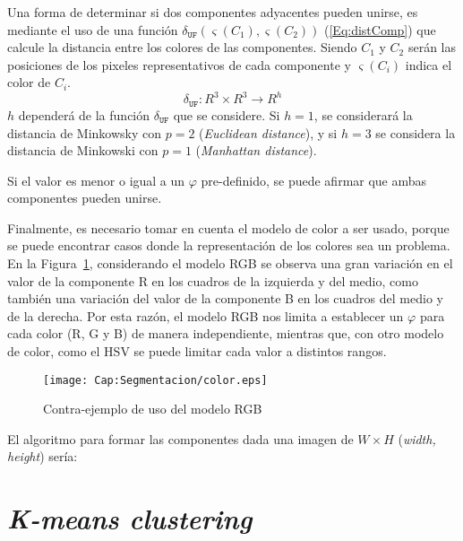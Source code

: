 Una forma de determinar si dos componentes adyacentes pueden unirse, es mediante
 el uso de una función $\delta_{\mathtt{UF}} (\varsigma (C_1), \varsigma (C_2))$
  (\ref{Eq:distComp}) que calcule la distancia entre los colores de las 
  componentes. Siendo $C_1$ y $C_2$ serán las posiciones de los pixeles 
  representativos de cada componente y $\varsigma(C_i)$ indica el color de $C_i$. 
\begin{equation}
	\delta_{\mathtt{UF}}:R^3\times R^3 \rightarrow R^h
	\label{Eq:distComp}
\end{equation}
$h$ dependerá de la función $\delta_{\mathtt{UF}}$ que se considere. Si $h=1$, 
se considerará la distancia de Minkowsky con $p=2$ (\textit{Euclidean 
distance}), y si $h=3$ se considera la distancia de Minkowski con $p=1$ 
(\textit{Manhattan distance}).\cite{Cordeiro:2012:Minkowski}

Si el valor es menor o igual a un $\varphi$ pre-definido, se puede afirmar que
 ambas componentes pueden unirse.

Finalmente, es necesario tomar en cuenta el modelo de color a ser usado, porque 
se puede encontrar casos donde la representación de los colores sea un problema.
 En la Figura~\ref{fig:cap-segmentacion:contraejemplo-rgb}, considerando el 
 modelo RGB se observa una gran variación en el valor de la componente R en los 
 cuadros de la izquierda y del medio, como también una variación del valor de 
 la componente B en los cuadros del medio y de la derecha. Por esta razón, el
  modelo RGB nos limita a establecer un $\varphi$ para cada color (R, G y B) de
   manera independiente, mientras que, con otro modelo de color, como el HSV se
    puede limitar cada valor a distintos rangos.

\begin{figure}
	\centering
	\texttt{[image: Cap:Segmentacion/color.eps]}
	\caption{Contra-ejemplo de uso del modelo RGB}
	\label{fig:cap-segmentacion:contraejemplo-rgb}
\end{figure}

El algoritmo para formar las componentes dada una imagen de $W\times H$
 (\textit{width, height}) sería:



\section{\textit{K-means clustering}}


